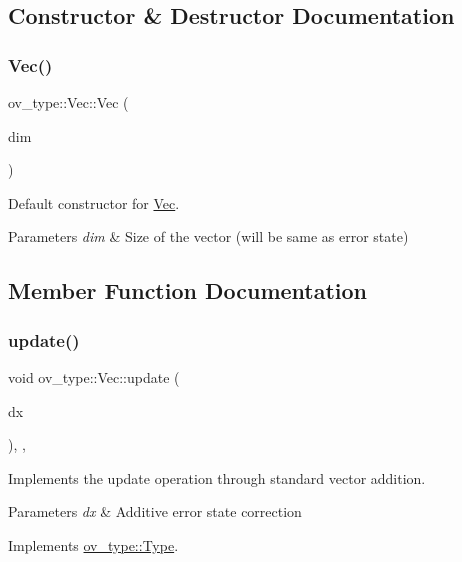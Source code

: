 \subsection{Constructor \& Destructor Documentation}
\mbox{\label{classov__type_1_1Vec_aae80ad8a2e9580f20ee90e126f36bcb0}} 
\subsubsection{\texorpdfstring{Vec()}{Vec()}}
{\footnotesize\ttfamily ov\+\_\+type\+::\+Vec\+::\+Vec (\begin{DoxyParamCaption}\item[{int}]{dim }\end{DoxyParamCaption})\hspace{0.3cm}{\ttfamily [inline]}}



Default constructor for \hyperlink{classov__type_1_1Vec}{Vec}. 


\begin{DoxyParams}{Parameters}
{\em dim} & Size of the vector (will be same as error state) \\
\hline
\end{DoxyParams}


\subsection{Member Function Documentation}
\mbox{\label{classov__type_1_1Vec_a7d66e9414946807c9469de0a1038256d}} 
\subsubsection{\texorpdfstring{update()}{update()}}
{\footnotesize\ttfamily void ov\+\_\+type\+::\+Vec\+::update (\begin{DoxyParamCaption}\item[{const Eigen\+::\+Vector\+Xd \&}]{dx }\end{DoxyParamCaption})\hspace{0.3cm}{\ttfamily [inline]}, {\ttfamily [override]}, {\ttfamily [virtual]}}



Implements the update operation through standard vector addition. 


\begin{DoxyParams}{Parameters}
{\em dx} & Additive error state correction \\
\hline
\end{DoxyParams}


Implements \hyperlink{classov__type_1_1Type_a4e133d50af35f07bd97f73590fe31000}{ov\+\_\+type\+::\+Type}.


